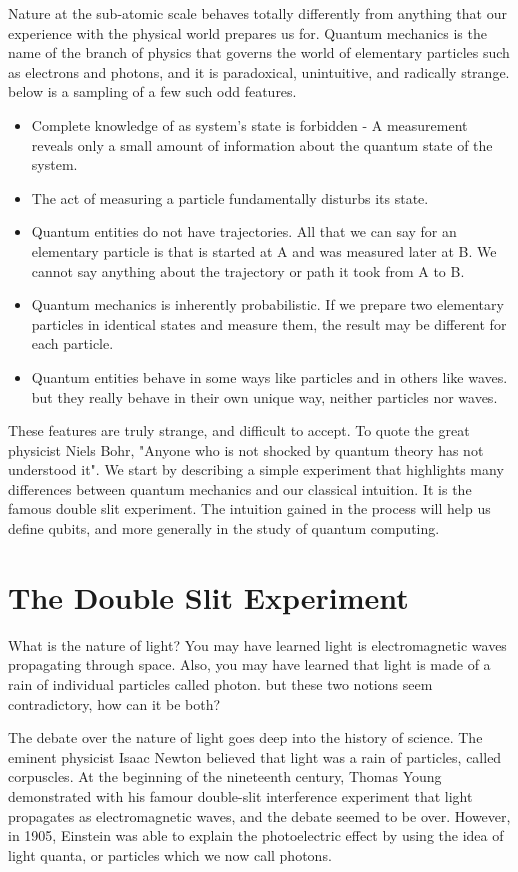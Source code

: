 \documentclass[12pt, oneside]{book}
\theoremstyle{definition}
\theoremstyle{definition}
\theoremstyle{remark}
\begin{document}
Nature at the sub-atomic scale behaves totally differently from anything that our experience with the physical world prepares us for. Quantum mechanics is the name of the branch of physics that governs the world of elementary particles such as electrons and photons, and it is paradoxical, unintuitive, and radically strange. below is a sampling of a few such odd features.
\begin{itemize}
    \item Complete knowledge of as system's state is forbidden - A measurement reveals only a small amount of information about the quantum state of the system.
    \item The act of measuring a particle fundamentally disturbs its state.
    \item Quantum entities do not have trajectories. All that we can say for an elementary particle is that is started at A and was measured later at B. We cannot say anything about the trajectory or path it took from A to B.
    \item Quantum mechanics is inherently probabilistic. If we prepare two elementary particles in identical states and measure them, the result may be different for each particle.
    \item Quantum entities behave in some ways like particles and in others like waves. but they really behave in their own unique way, neither particles nor waves.
\end{itemize}
These features are truly strange, and difficult to accept. To quote the great physicist Niels Bohr, "Anyone who is not shocked by quantum theory has not understood it". We start by describing a simple experiment that highlights many differences between quantum mechanics and our classical intuition. It is the famous double slit experiment. The intuition gained in the process will help us define qubits, and more generally in the study of quantum computing.

\section{The Double Slit Experiment}
What is the nature of light? You may have learned light is electromagnetic waves propagating through space. Also, you may have learned that light is made of a rain of individual particles called photon. but these two notions seem contradictory, how can it be both?

The debate over the nature of light goes deep into the history of science. The eminent physicist Isaac Newton believed that light was a rain of particles, called corpuscles. At the beginning of the nineteenth century, Thomas Young demonstrated with his famour double-slit interference experiment that light propagates as electromagnetic waves, and the debate seemed to be over. However, in 1905, Einstein was able to explain the photoelectric effect by using the idea of light quanta, or particles which we now call photons.
\end{document}
